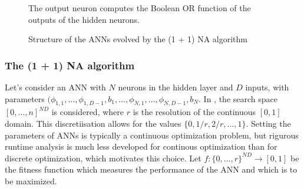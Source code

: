 \begin{figure}
    \begin{center}
        \caption{Structure of the ANNs evolved by the (1 + 1) NA algorithm}{The output neuron computes the Boolean OR function of the outputs of the hidden neurons.}
        \label{fig:oneplusonena_ann}
    \end{center}
\end{figure}

\subsubsection{The (1 + 1) NA algorithm}

Let's consider an ANN with $N$ neurons in the hidden layer and $D$ inputs, with parameters
$(\phi_{1,1}, \dots, \phi_{1,D-1}, b_1, \dots, \phi_{N,1}, \dots, \phi_{N,D-1}, b_N$.
In \cite{na}, the search space $[0 , \dots, n]^{N D}$ is considered, where $r$ is the resolution of the continuous $[0, 1]$ domain.
This discretiisation allows for the values $\{0, 1/r, 2/r, \dots, 1\}$. Setting the parameters of ANNs is typically a continuous optimization problem,
but rigurous runtime analysis is much less developed for continous optimization than for discrete optimization, which motivates this choice.
Let $f : \{0 , \dots, r\}^{N D} \to [0, 1]$ be the fitness function which measures the performance of the ANN and which is to be maximized.

